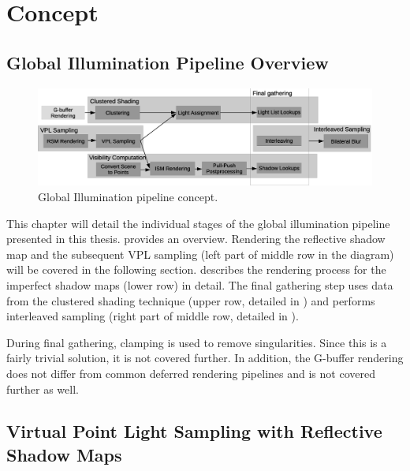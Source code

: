 
\chapter{Concept}
\label{chap:concept}

\section{Global Illumination Pipeline Overview}
\label{sec:concept:overview}

\begin{figure}[h]
    \includegraphics[width=\textwidth]{graphics/GI_pipeline_concept_rough}
    \caption{Global Illumination pipeline concept.}
    \label{fig:GIPipelineConcept}
\end{figure}


This chapter will detail the individual stages of the global illumination pipeline presented in this thesis.  provides an overview.
Rendering the reflective shadow map and the subsequent VPL sampling (left part of middle row in the diagram) will be covered in the following section.
 describes the rendering process for the imperfect shadow maps (lower row) in detail.
The final gathering step uses data from the clustered shading technique (upper row, detailed in ) and performs interleaved sampling (right part of middle row, detailed in ).

During final gathering, clamping is used to remove singularities. Since this is a fairly trivial solution, it is not covered further.
In addition, the G-buffer rendering does not differ from common deferred rendering pipelines and is not covered further as well.


\section{Virtual Point Light Sampling with Reflective Shadow Maps}
\label{sec:concept:rsmVplSampling}

